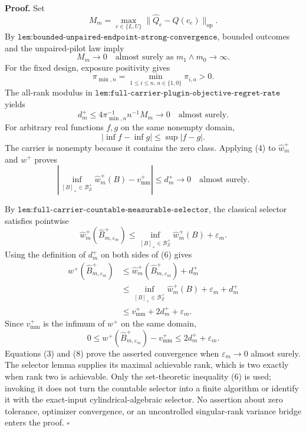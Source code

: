 \textbf{Proof.}
Set
\[
M_m=\max_{e\in\{L,U\}}
\lVert\widehat Q_e-Q(c_e)\rVert_{\mathrm{op}}.
\]
By \(\texttt{lem:bounded-unpaired-endpoint-strong-convergence}\), bounded outcomes and the unpaired-pilot law imply
\[
M_m\longrightarrow0
\quad\text{almost surely as }m_1\wedge m_0\to\infty.
\tag{1}
\]
For the fixed design, exposure positivity gives
\[
\pi_{\min,n}=\min_{1\le i\le n,\,a\in\{1,0\}}\pi_{i,a}>0.
\tag{2}
\]
The all-rank modulus in \(\texttt{lem:full-carrier-plugin-objective-regret-rate}\) yields
\[
d_m^+
\le4\pi_{\min,n}^{-1}n^{-1}M_m
\longrightarrow0
\quad\text{almost surely}.
\tag{3}
\]
For arbitrary real functions \(f,g\) on the same nonempty domain,
\[
|\inf f-\inf g|\le\sup|f-g|.
\tag{4}
\]
The carrier is nonempty because it contains the zero class.  Applying (4) to \(\widehat w_m^+\) and \(w^+\) proves
\[
\left|
\inf_{[B]_+\in\mathcal B_Z^+}\widehat w_m^+(B)
-v_{\mathrm{mm}}^+
\right|
\le d_m^+\longrightarrow0
\quad\text{almost surely}.
\tag{5}
\]

By \(\texttt{lem:full-carrier-countable-measurable-selector}\), the classical selector satisfies pointwise
\[
\widehat w_m^+(\widehat B_{m,\varepsilon_m}^+)
\le
\inf_{[B]_+\in\mathcal B_Z^+}\widehat w_m^+(B)+\varepsilon_m.
\tag{6}
\]
Using the definition of \(d_m^+\) on both sides of (6) gives
\[
\begin{aligned}
w^+(\widehat B_{m,\varepsilon_m}^+)
&\le\widehat w_m^+(\widehat B_{m,\varepsilon_m}^+)+d_m^+\\
&\le\inf_{[B]_+\in\mathcal B_Z^+}\widehat w_m^+(B)
+\varepsilon_m+d_m^+\\
&\le v_{\mathrm{mm}}^++2d_m^++\varepsilon_m.
\end{aligned}
\tag{7}
\]
Since \(v_{\mathrm{mm}}^+\) is the infimum of \(w^+\) on the same domain,
\[
0\le w^+(\widehat B_{m,\varepsilon_m}^+)-v_{\mathrm{mm}}^+
\le2d_m^++\varepsilon_m.
\tag{8}
\]
Equations (3) and (8) prove the asserted convergence when \(\varepsilon_m\to0\) almost surely.  The selector lemma supplies its maximal achievable rank, which is two exactly when rank two is achievable.  Only the set-theoretic inequality (6) is used; invoking it does not turn the countable selector into a finite algorithm or identify it with the exact-input cylindrical-algebraic selector.  No assertion about zero tolerance, optimizer convergence, or an uncontrolled singular-rank variance bridge enters the proof. \(\square\)